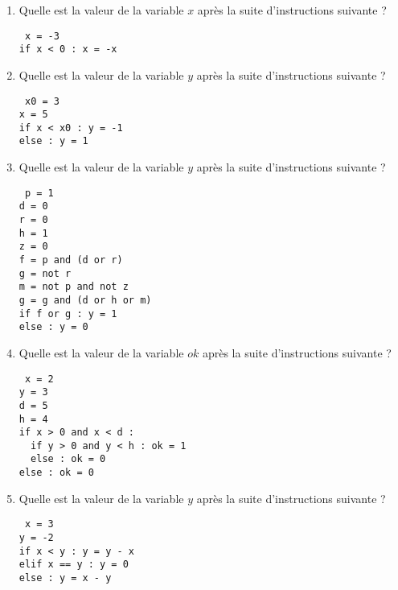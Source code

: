 \begin{td}\label{td:seq3}\em {}
\begin{enumerate}
\item Quelle est la valeur de la variable $x$ après la suite
	d'instructions suivante ?

	{\footnotesize\tt
	x = -3\\
	if x < 0 : x = -x
	}
\item Quelle est la valeur de la variable $y$ après la suite
	d'instructions suivante ?

	{\footnotesize\tt
	x0 = 3\\
	x = 5\\
	if x < x0 : y = -1\\
	else : y = 1
	}
\item Quelle est la valeur de la variable $y$ après la suite
	d'instructions suivante ?

	{\footnotesize\tt
	p = 1\\
	d = 0\\
	r = 0\\
	h = 1\\
	z = 0\\
	f = p and (d or r)\\
	g = not r \\
	m = not p and not z\\
	g = g and (d or h or m)\\
	if f or g : y = 1\\
	else : y = 0
	}
\item Quelle est la valeur de la variable $ok$ après la suite
	d'instructions suivante ?

	{\footnotesize\tt
	x = 2\\
	y = 3\\
	d = 5\\
	h = 4\\
	if x > 0 and x < d :\\
  	\mbox{}\ \ if y > 0 and y < h : ok = 1\\
	\mbox{}\ \ else : ok = 0\\
	else : ok = 0
	}
\item Quelle est la valeur de la variable $y$ après la suite
	d'instructions suivante ?

	{\footnotesize\tt
	x = 3\\
	y = -2\\
	if x < y : y = y - x\\
	elif x == y : y = 0\\
	else : y = x - y
	}
\end{enumerate}
\end{td}
 

